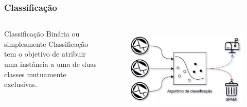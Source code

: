 \documentclass[aspectratio=169]{beamer}
\begin{document}
\begin{frame}
    \frametitle{Classificação}
    \begin{columns}

        Classificação Binária ou simplesmente Classificação tem o objetivo de atribuir uma instância a uma de duas classes mutuamente exclusivas.

        \begin{figure}
            \centering
            \includegraphics[scale = 0.75 ]{img/email_classifier.png}
            \label{fig:enter-label}
        \end{figure}


    \end{columns}
\end{frame}


\end{document}
